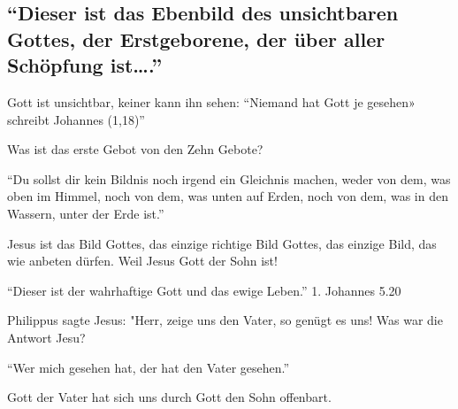 \documentclass[
  12pt,
]{krantz}
\begin{document}
\hypertarget{dieser-ist-das-ebenbild-des-unsichtbaren-gottes-der-erstgeborene-der-uxfcber-aller-schuxf6pfung-ist.}{%
\subsection{``Dieser ist das Ebenbild des unsichtbaren Gottes, der Erstgeborene, der über aller Schöpfung ist\ldots.''}\label{dieser-ist-das-ebenbild-des-unsichtbaren-gottes-der-erstgeborene-der-uxfcber-aller-schuxf6pfung-ist.}}

Gott ist unsichtbar, keiner kann ihn sehen:
``Niemand hat Gott je gesehen» schreibt Johannes (1,18)''

Was ist das erste Gebot von den Zehn Gebote?

``Du sollst dir kein Bildnis noch irgend ein Gleichnis machen, weder von dem, was oben im Himmel, noch von dem, was unten auf Erden, noch von dem, was in den Wassern, unter der Erde ist.''

Jesus ist das Bild Gottes, das einzige richtige Bild Gottes, das einzige Bild, das wie anbeten dürfen. Weil Jesus Gott der Sohn ist!

``Dieser ist der wahrhaftige Gott und das ewige Leben.'' 1. Johannes 5.20

Philippus sagte Jesus: "Herr, zeige uns den Vater, so genügt es uns! Was war die Antwort Jesu?

``Wer mich gesehen hat, der hat den Vater gesehen.''

Gott der Vater hat sich uns durch Gott den Sohn offenbart.

  

\printindex
\end{document}

